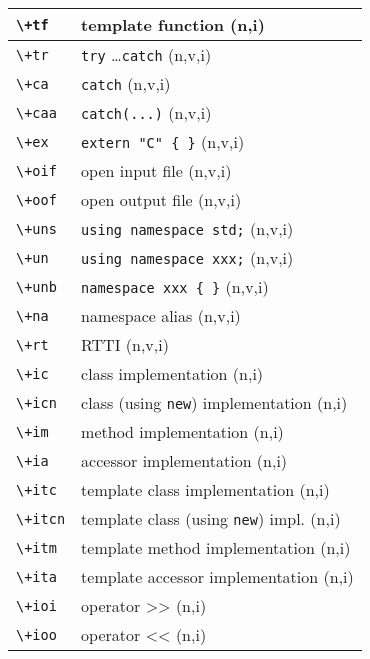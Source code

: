 \documentclass[oneside,11pt,landscape,DIV16]{scrartcl}
\begin{document}
\begin{multicols}{3}
\begin{center}
\begin{tabular}[]{|p{12mm}|p{60mm}|}
\hline \verb'\+tf'  & template function                    \hfill (n,i)\\
\hline
\hline \verb'\+tr'  & \verb'try' \dots \verb'catch'        \hfill (n,v,i)\\
\hline \verb'\+ca'  & \verb'catch'                         \hfill (n,v,i)\\
\hline \verb'\+caa' & \verb'catch(...)'                    \hfill (n,v,i)\\
\hline
\hline \verb'\+ex'  & \verb'extern "C" { }'                \hfill (n,v,i)\\
\hline \verb'\+oif' & open input file                      \hfill (n,v,i)\\
\hline \verb'\+oof' & open output file                     \hfill (n,v,i)\\
\hline \verb'\+uns' & \verb'using namespace std;'          \hfill (n,v,i)\\
\hline \verb'\+un'  & \verb'using namespace xxx;'          \hfill (n,v,i)\\
\hline \verb'\+unb' & \verb'namespace xxx { }'             \hfill (n,v,i)\\
\hline \verb'\+na'  & namespace alias                      \hfill (n,v,i)\\
\hline \verb'\+rt'  & RTTI                                 \hfill (n,v,i)\\
%
\hline
\hline \verb'\+ic'  & class  implementation                   \hfill (n,i)\\
\hline \verb'\+icn' & class (using \verb'new') implementation \hfill (n,i)\\
\hline \verb'\+im'  & method implementation                   \hfill (n,i)\\
\hline \verb'\+ia'  & accessor implementation                 \hfill (n,i)\\
\hline \verb'\+itc' & template class  implementation          \hfill (n,i)\\
\hline \verb'\+itcn'& template class (using \verb'new') impl. \hfill (n,i)\\
\hline \verb'\+itm' & template method implementation          \hfill (n,i)\\
\hline \verb'\+ita' & template accessor implementation        \hfill (n,i)\\
\hline \verb'\+ioi' & operator >>                             \hfill (n,i)\\
\hline \verb'\+ioo' & operator <<                             \hfill (n,i)\\
\hline 
\end{tabular}

\end{center}
\end{multicols}
\end{document}
